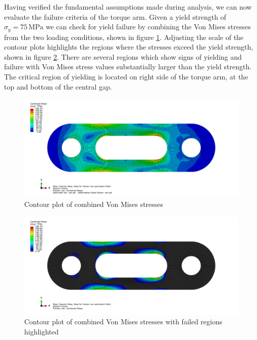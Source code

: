 \documentclass[../main.tex]{subfiles}
\begin{document}
Having verified the fundamental assumptions made during analysis, we can now evaluate the failure criteria of the torque arm.
Given a yield strength of \(\sigma_{y}=75\,\unit{\mega\pascal}\) we can check for yield failure by combining the Von Mises stresses from the two loading conditions, shown in figure \ref{baseline_combined_mises}.
Adjusting the scale of the contour plots highlights the regions where the stresses exceed the yield strength, shown in figure \ref{baseline_combined_mises_limited}.
There are several regions which show signs of yielding and failure with Von Mises stress values substantially larger than the yield strength.
The critical region of yielding is located on right side of the torque arm, at the top and bottom of the central gap.

\begin{figure}[H]
    \centering
    \includegraphics[scale=0.2]{../../images/baseline_combined_mises.png}
    \caption{Contour plot of combined Von Mises stresses}
    \label{baseline_combined_mises}
\end{figure}

\begin{figure}[H]
    \centering
    \includegraphics[scale=0.2]{../../images/baseline_combined_mises_limited.png}
    \caption{Contour plot of combined Von Mises stresses with failed regions highlighted}
    \label{baseline_combined_mises_limited}
\end{figure}
\end{document}
